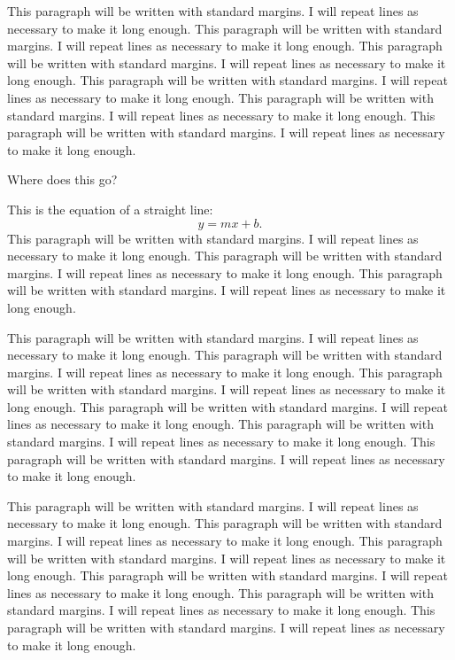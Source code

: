 \documentclass[numbib]{buthesis_p}  %
\begin{document}
This paragraph will be written with standard margins. I will repeat
lines as necessary to make it long enough. This paragraph will be
written with standard margins. I will repeat lines as necessary to
make it long enough. This paragraph will be written with standard
margins. I will repeat lines as necessary to make it long enough. This
paragraph will be written with standard margins. I will repeat lines
as necessary to make it long enough. This paragraph will be written
with standard margins. I will repeat lines as necessary to make it
long enough. This paragraph will be written with standard margins. I
will repeat lines as necessary to make it long enough.

Where does this go?

This is the equation of a straight line:
\begin{equation}
y = mx + b.
\end{equation}
This paragraph will be written with standard margins. I will repeat
lines as necessary to make it long enough. This paragraph will be
written with standard margins. I will repeat lines as necessary to
make it long enough. This paragraph will be written with standard
margins. I will repeat lines as necessary to make it long enough.


This paragraph will be written with standard margins. I will repeat
lines as necessary to make it long enough. This paragraph will be
written with standard margins. I will repeat lines as necessary to
make it long enough. This paragraph will be written with standard
margins. I will repeat lines as necessary to make it long enough.
This paragraph will be written with standard margins. I will repeat
lines as necessary to make it long enough. This paragraph will be
written with standard margins. I will repeat lines as necessary to
make it long enough. This paragraph will be written with standard
margins. I will repeat lines as necessary to make it long enough.


This paragraph will be written with standard margins. I will repeat
lines as necessary to make it long enough. This paragraph will be
written with standard margins. I will repeat lines as necessary to
make it long enough. This paragraph will be written with standard
margins. I will repeat lines as necessary to make it long enough. This
paragraph will be written with standard margins. I will repeat lines
as necessary to make it long enough. This paragraph will be written
with standard margins. I will repeat lines as necessary to make it
long enough. This paragraph will be written with standard margins. I
will repeat lines as necessary to make it long enough.
\end{document}
